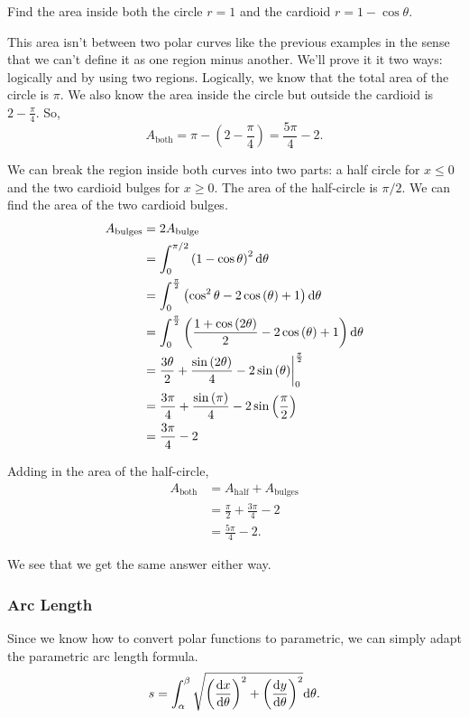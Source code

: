 \begin{example}
	Find the area inside both the circle $r=1$ and the cardioid $r=1-\cos{\theta}$.
\end{example}
\begin{answer}
	This area isn't between two polar curves like the previous examples in the sense that we can't define it as one region minus another.
	We'll prove it it two ways: logically and by using two regions.
	Logically, we know that the total area of the circle is $\pi$.
	We also know the area inside the circle but outside the cardioid is $2-\frac{\pi}{4}$.
	So,
	\begin{equation*}
		A_{\text{both}} = \pi - \left(2-\frac{\pi}{4}\right) = \frac{5\pi}{4} - 2.
	\end{equation*}
	
	We can break the region inside both curves into two parts: a half circle for $x\leq 0$ and the two cardioid bulges for $x\geq 0$.
	The area of the half-circle is $\pi/2$.
	We can find the area of the two cardioid bulges.
	\begin{align*}
		A_{\text{bulges}} &= 2A_{\text{bulge}} \\
		&= \int_{0}^{\pi/2}{\left(1-\cos{\theta}\right)^2\mathrm{d} \theta} \\
		&= \int_{0}^{\frac{\pi}{2}}\left(\cos^{2}\theta-2\cos\left(\theta\right)+1\right)\mathrm{d} \theta \\
		&= \int_{0}^{\frac{\pi}{2}}\left(\frac{1+\cos\left(2\theta\right)}{2}-2\cos\left(\theta\right)+1\right)\mathrm{d} \theta \\
		&= \frac{3\theta}{2}+\frac{\sin\left(2\theta\right)}{4}-2\sin\left(\theta\right)\biggr\rvert_{0}^{\frac{\pi}{2}} \\
		&= \frac{3\pi}{4}+\frac{\sin\left(\pi\right)}{4}-2\sin\left(\frac{\pi}{2}\right) \\
		&= \frac{3\pi}{4}-2
	\end{align*}
	
	Adding in the area of the half-circle,
	\begin{align*}
		A_{\text{both}} &= A_{\text{half}} + A_{\text{bulges}} \\
		&= \frac{\pi}{2} + \frac{3\pi}{4} - 2 \\
		&= \frac{5\pi}{4} - 2.
	\end{align*}
	
	We see that we get the same answer either way.
\end{answer}

\subsubsection{Arc Length}
Since we know how to convert polar functions to parametric, we can simply adapt the parametric arc length formula.
\begin{equation*}
	s = \int_{\alpha}^{\beta}{\sqrt{\left(\frac{\mathrm{d} x}{\mathrm{d} \theta}\right)^2 + \left(\frac{\mathrm{d} y}{\mathrm{d} \theta}\right)^2}\mathrm{d} \theta}.
\end{equation*}


